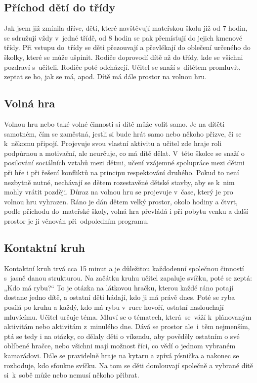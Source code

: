 		\subsection{Příchod dětí do třídy}
			Jak jsem již zmínila dříve, děti, které navštěvují mateřskou školu již od 7 hodin, se sdružují vždy v jedné třídě, od 8 hodin se pak přemísťují do jejich kmenové třídy. Při vstupu do třídy se děti přezouvají a převlékají do oblečení určeného do školky, které se může ušpinit. Rodiče doprovodí dítě až do třídy, kde se všichni pozdraví s učiteli. Rodiče poté odcházejí. Učitel se snaží s dítětem promluvit, zeptat se ho, jak se má, apod.  Dítě má dále prostor na volnou hru.

		\subsection{Volná hra}
			Volnou hru nebo také volné činnosti si dítě může volit samo. Je na dítěti samotném, čím se zaměstná, jestli si bude hrát samo nebo někoho přizve, či se k někomu připojí. Projevuje svou vlastní aktivitu a učitel zde hraje roli podpůrnou a motivační, ale neurčuje, co má dítě dělat. V této školce se snaží o posilování sociálních vztahů mezi dětmi, učení vzájemné spolupráce mezi dětmi při hře i při řešení konfliktů na principu respektování druhého. Pokud to není nezbytně nutné, nechávají se dětem rozestavěné dětské stavby, aby se k nim mohly vrátit později. Důraz na volnou hru se projevuje v čase, který je pro volnou hru vyhrazen. Ráno je dán dětem velký prostor, okolo hodiny a čtvrt, podle příchodu do mateřské školy, volná hra převládá i při pobytu venku a další prostor je jí věnován při odpoledním programu. 

		\subsection{Kontaktní kruh}
			Kontaktní kruh trvá cca 15 minut a je důležitou každodenní společnou činností s jasně danou strukturou. Na začátku kruhu učitel zapaluje svíčku, poté se zeptá: „Kdo má rybu?“ To je otázka na látkovou hračku, kterou každé ráno potají dostane jedno dítě, a ostatní děti hádají, kdo ji má právě dnes. Poté se ryba posílá po kruhu a každý, kdo má rybu v ruce hovoří, ostatní naslouchají mluvícímu. Učitel určuje téma. Mluví se o tématech, která se váží k plánovaným aktivitám nebo aktivitám z minulého dne. Dává se prostor ale i těm nejmenším, ptá se tedy i na otázky, co dělaly děti o víkendu, aby pověděly ostatním o své oblíbené hračce, nebo všichni mají možnost říci, co vědí o jednom vybraném kamarádovi. Dále se pravidelně hraje na kytaru a zpívá písnička a nakonec se rozhoduje, kdo sfoukne svíčku. Na tom se děti domlouvají společně a vybrané dítě si k sobě může nebo nemusí někoho přibrat. 

